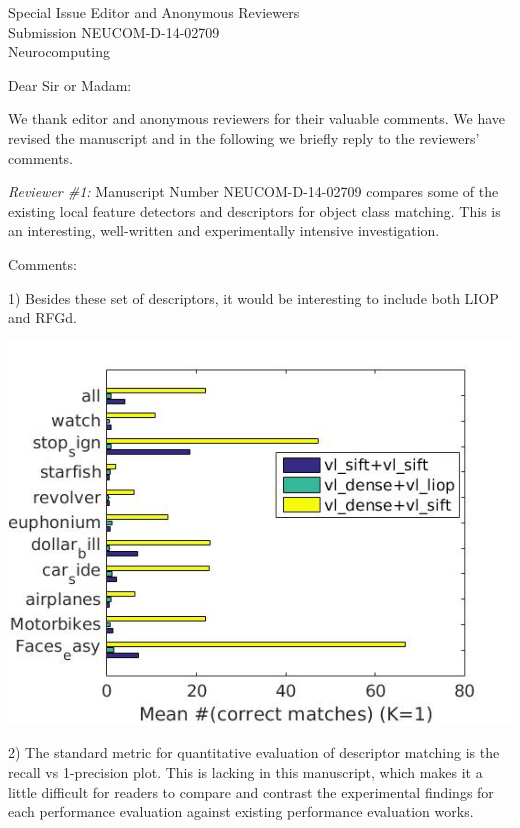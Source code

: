 \documentclass{letter}
\begin{document}
\begin{letter}{Special Issue Editor and Anonymous Reviewers\\
Submission NEUCOM-D-14-02709\\
Neurocomputing}

\opening{Dear Sir or Madam:}

We thank editor and anonymous reviewers for their valuable comments.
We have revised the manuscript and in
the following we briefly reply to the reviewers' comments.

{\em Reviewer \#1:}
Manuscript Number NEUCOM-D-14-02709 compares some of the existing local feature
detectors and descriptors for object class matching.  This is an interesting,
well-written and experimentally intensive investigation. 

Comments:

1)	Besides these set of descriptors, it would be interesting to include both LIOP and RFGd.


\includegraphics[width=0.5\linewidth]{resources/liop.jpg}

2)	The standard metric for quantitative evaluation of descriptor matching is
the recall vs 1-precision plot. This is lacking in this manuscript, which makes it
a little difficult for readers to compare and contrast the experimental findings
for each performance evaluation against existing performance evaluation works.



\end{letter}
\end{document}
